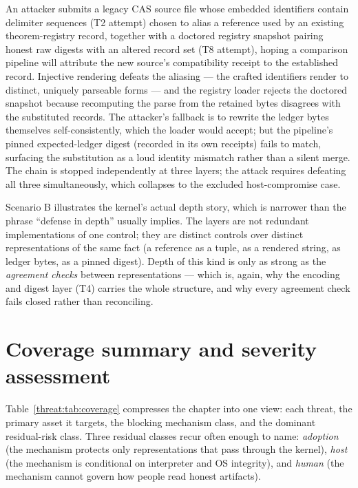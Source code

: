 \begin{example}\label{threat:ex:compoundB}
An attacker submits a legacy CAS source file whose embedded identifiers contain delimiter sequences (T2 attempt) chosen to alias a reference used by an existing theorem-registry record, together with a doctored registry snapshot pairing honest raw digests with an altered record set (T8 attempt), hoping a comparison pipeline will attribute the new source's compatibility receipt to the established record. Injective rendering defeats the aliasing --- the crafted identifiers render to distinct, uniquely parseable forms --- and the registry loader rejects the doctored snapshot because recomputing the parse from the retained bytes disagrees with the substituted records. The attacker's fallback is to rewrite the ledger bytes themselves self-consistently, which the loader would accept; but the pipeline's pinned expected-ledger digest (recorded in its own receipts) fails to match, surfacing the substitution as a loud identity mismatch rather than a silent merge. The chain is stopped independently at three layers; the attack requires defeating all three simultaneously, which collapses to the excluded host-compromise case.
\end{example}

\begin{remark}\label{threat:rem:depth}
Scenario B illustrates the kernel's actual depth story, which is narrower than the phrase ``defense in depth'' usually implies. The layers are not redundant implementations of one control; they are distinct controls over distinct representations of the same fact (a reference as a tuple, as a rendered string, as ledger bytes, as a pinned digest). Depth of this kind is only as strong as the \emph{agreement checks} between representations --- which is, again, why the encoding and digest layer (T4) carries the whole structure, and why every agreement check fails closed rather than reconciling.
\end{remark}

\section{Coverage summary and severity assessment}\label{threat:coverage}

Table~\ref{threat:tab:coverage} compresses the chapter into one view: each threat, the primary asset it targets, the blocking mechanism class, and the dominant residual-risk class. Three residual classes recur often enough to name: \emph{adoption} (the mechanism protects only representations that pass through the kernel), \emph{host} (the mechanism is conditional on interpreter and OS integrity), and \emph{human} (the mechanism cannot govern how people read honest artifacts).

